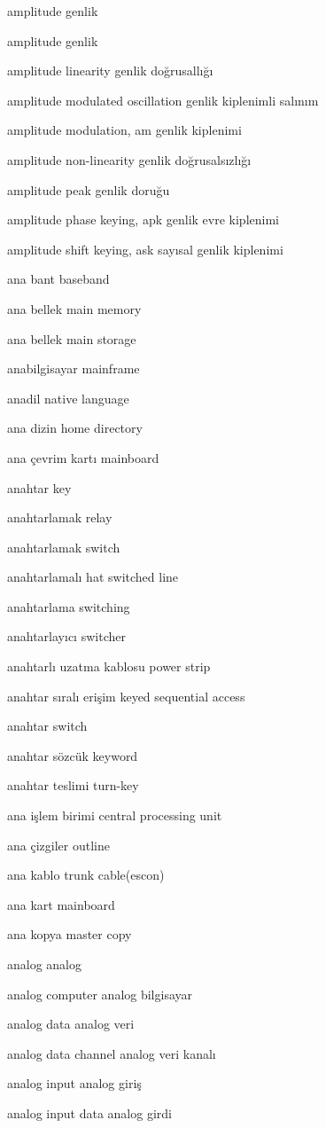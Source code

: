 \documentclass[12pt,fleqn]{article}\usepackage{../../common}
\begin{document}
amplitude genlik

amplitude genlik

amplitude linearity genlik doğrusallığı

amplitude modulated oscillation genlik kiplenimli salınım

amplitude modulation, am genlik kiplenimi

amplitude non-linearity genlik doğrusalsızlığı

amplitude peak genlik doruğu

amplitude phase keying, apk genlik evre kiplenimi

amplitude shift keying, ask sayısal genlik kiplenimi

ana bant baseband

ana bellek main memory

ana bellek main storage

anabilgisayar mainframe

anadil native language

ana dizin home directory

ana çevrim kartı mainboard

anahtar key

anahtarlamak relay

anahtarlamak switch

anahtarlamalı hat switched line

anahtarlama switching

anahtarlayıcı switcher

anahtarlı uzatma kablosu power strip

anahtar sıralı erişim keyed sequential access

anahtar switch

anahtar sözcük keyword

anahtar teslimi turn-key

ana işlem birimi central processing unit

ana çizgiler outline

ana kablo trunk cable(escon)

ana kart mainboard

ana kopya master copy

analog analog

analog computer analog bilgisayar

analog data analog veri

analog data channel analog veri kanalı

analog input analog giriş

analog input data analog girdi
\end{document}
